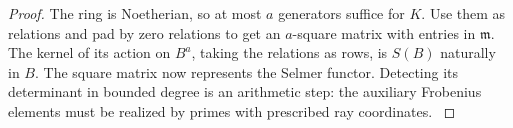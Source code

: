 \begin{proof}
The ring is Noetherian, so at most \(a\) generators suffice
for \(K\). Use them as relations and pad by zero relations
to get an \(a\)-square matrix with entries in \(\mathfrak m\).
The kernel of its action on \(B^a\), taking the relations
as rows, is \(S(B)\) naturally in \(B\). The square matrix now represents the Selmer functor. Detecting its determinant in bounded degree is an arithmetic step: the auxiliary Frobenius elements must be realized by primes with prescribed ray coordinates. \label{cor:retained-twist-3}
\end{proof}

